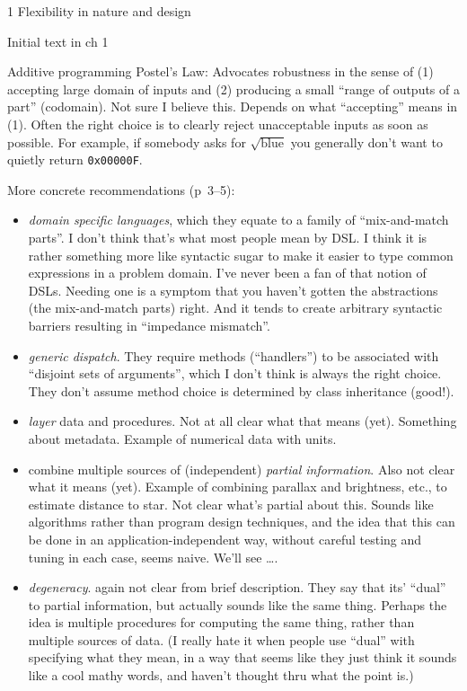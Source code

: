 \documentclass[12pt]{PalisadesLakesBook}
\begin{document}
\begin{plSection}{}
\begin{plSection}{1 Flexibility in nature and design}
\begin{plSection}{Initial text in ch 1}
\begin{plSection}{Additive programming}
Postel's Law: Advocates robustness in the sense of
(1) accepting large domain of inputs
and (2) producing a small ``range of outputs of a part'' 
(codomain).
Not sure I believe this.
Depends on what ``accepting'' means in (1).
Often the right choice is to clearly reject unacceptable inputs
as soon as possible.
For example, if somebody asks for $\sqrt{\text{blue}}$
you generally don't want to quietly return \texttt{0x00000F}.

More concrete recommendations (p~3--5):
\begin{itemize}
  \item \emph{domain specific languages}, 
  which they equate to a family
  of ``mix-and-match parts''. I don't think that's 
  what most people mean by DSL. 
  I think it is rather something more like
  syntactic sugar to make it easier to type common expressions
  in a problem domain. I've never been a fan of that notion of
  DSLs. Needing one is a symptom that you haven't gotten the
  abstractions (the mix-and-match parts) right. And it tends
  to create arbitrary syntactic barriers resulting in 
  ``impedance mismatch''.
  \item \emph{generic dispatch}. They require methods (``handlers'')
  to be associated with ``disjoint sets of arguments'', 
  which I don't think is always the right choice.
  They don't assume method choice is determined by class
  inheritance (good!).
  \item \emph{layer} data and procedures. Not at all clear what 
  that means (yet). Something about metadata.
  Example of numerical data with units.  
  \item combine multiple sources of (independent) 
  \emph{partial information}. 
  Also not clear what it means (yet).
  Example of combining parallax and brightness, etc., to estimate
  distance to star. 
  Not clear what's partial about this.
  Sounds like algorithms rather than
  program design techniques, and the idea that this can be done
  in an application-independent way, without careful
  testing and tuning in each case, seems naive.
  We'll see {\ldots}.
  \item \emph{degeneracy}. again not clear from brief description.
  They say that its' ``dual'' to partial
  information, but actually sounds like the same thing.
  Perhaps the idea is multiple procedures for computing the same
  thing, rather than multiple sources of data.
  (I really hate it when people use ``dual'' with specifying
  what they mean, in a way that seems like they just
  think it sounds like a cool mathy words, 
  and haven't thought thru what the point is.)
\end{itemize}


\end{plSection}
\end{plSection}
\end{plSection}
\end{plSection}
\end{document}
